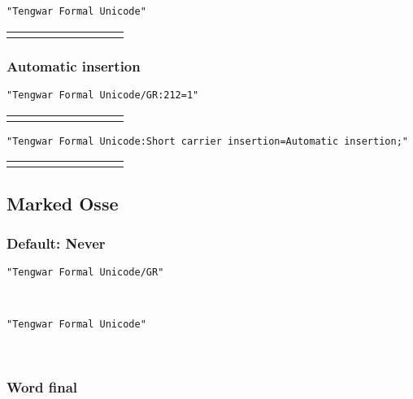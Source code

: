 \documentclass[11pt,a4paper]{article}
\begin{document}
\noindent \texttt{"Tengwar Formal Unicode"}

\formalAAT
\begin{tabular}{ c | c c c c c c c c}
	\combinationsrow{} \hline
	\combinationsrow{}
	\combinationsrow{}
	\combinationsrow{}
	\combinationsrow{}
	\combinationsrow{}
	\combinationsrow{}
	\combinationsrow{}
	\combinationsrow{}
\end{tabular}

\subsubsection{Automatic insertion}

\texttt{"Tengwar Formal Unicode/GR:212=1"}

\formalGRinsert
\begin{tabular}{ c | c c c c c c c c}
	\combinationsrow{} \hline
	\combinationsrow{}
	\combinationsrow{}
	\combinationsrow{}
	\combinationsrow{}
	\combinationsrow{}
	\combinationsrow{}
	\combinationsrow{}
	\combinationsrow{}
\end{tabular}

\noindent \texttt{"Tengwar Formal Unicode:Short carrier insertion=Automatic insertion;"}

\formalAATinsert
\begin{tabular}{ c | c c c c c c c c}
	\combinationsrow{} \hline
	\combinationsrow{}
	\combinationsrow{}
	\combinationsrow{}
	\combinationsrow{}
	\combinationsrow{}
	\combinationsrow{}
	\combinationsrow{}
	\combinationsrow{}
\end{tabular}


\subsection{Marked Osse}

\subsubsection{Default: Never}

\texttt{"Tengwar Formal Unicode/GR"}

\formalGR 

\noindent \texttt{"Tengwar Formal Unicode"}

\formalAAT 

\subsubsection{Word final}
\end{document}

